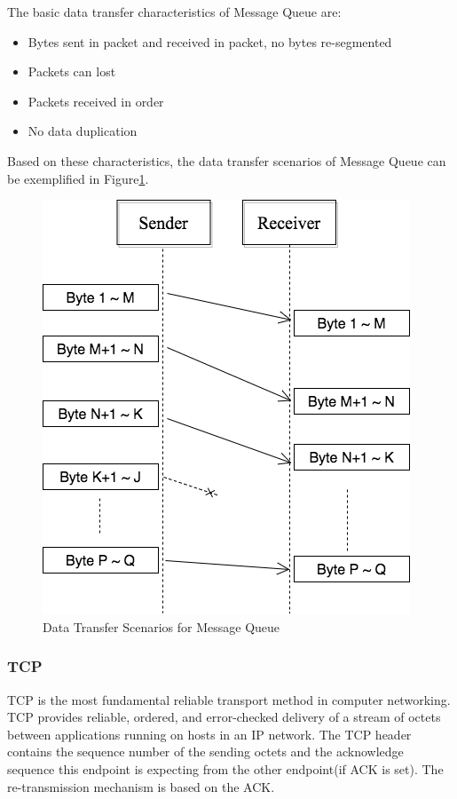 The basic data transfer characteristics of Message Queue are:
\begin{itemize}
  \item Bytes sent in packet and received in packet, no bytes re-segmented
  \item Packets can lost
  \item Packets received in order
  \item No data duplication
\end{itemize}
Based on these characteristics, the data transfer scenarios of Message Queue can be exemplified in Figure\ref{msmq}.
\begin{figure}[H]
\centerline{\includegraphics[scale=0.48]{Figures/msmq}}
\caption{Data Transfer Scenarios for Message Queue}
\label{msmq}
\end{figure}

\subsubsection{TCP}
TCP is the most fundamental reliable transport method in computer networking. TCP provides reliable, ordered, and error-checked delivery of a stream of octets between applications running on hosts in an IP network. The TCP header contains the sequence number of the sending octets and the acknowledge sequence this endpoint is expecting from the other endpoint(if ACK is set). The re-transmission mechanism is based on the ACK. 

